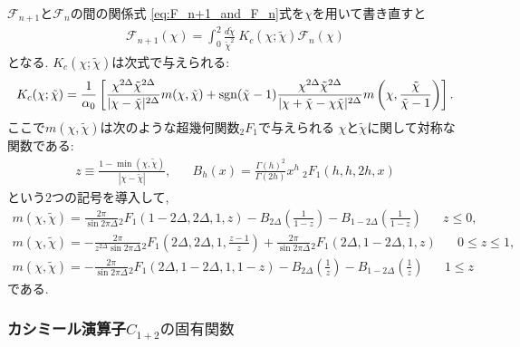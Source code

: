 $\mathcal{F}_{n+1}$と$\mathcal{F}_n$の間の関係式
\eqref{eq:F_n+1_and_F_n}式を$\chi$を用いて書き直すと
\begin{align}
	\mathcal{F}_{n+1}(\chi)
	= \int_0^2 \frac{d\tilde{\chi}}{\tilde{\chi}^2}\ 
		K_c(\chi; \tilde{\chi})\mathcal{F}_n(\chi)
	\label{eq:F_n+1_and_F_n_in_chi}
\end{align}
となる. 
$K_c(\chi; \tilde{\chi})$は次式で与えられる:
\begin{align}
	K_c(\chi; \tilde{\chi}) = \frac{1}{\alpha_0}\left[
		\frac{\chi^{2\Delta}\tilde{\chi}^{2\Delta}}{|\chi - \tilde{\chi}|^{2\Delta}}
		m(\chi, \tilde{\chi}) + \mathrm{sgn}(\tilde{\chi} - 1)
		\frac{\chi^{2\Delta}\tilde{\chi}^{2\Delta}}
			 {|\chi + \tilde{\chi} - \chi\tilde{\chi}|^{2\Delta}}
		m\left(\chi, \frac{\tilde{\chi}}{\tilde{\chi} - 1}\right)
	\right].
\end{align}
ここで$m(\chi, \tilde{\chi})$は次のような超幾何関数${}_2F_1$で与えられる
$\chi$と$\tilde{\chi}$に関して対称な関数である:
\begin{align}
	z \equiv \frac{1 - \min(\chi, \tilde{\chi})}{|\chi - \tilde{\chi}|},\hspace{20pt}
	B_h(x) = \frac{\Gamma(h)^2}{\Gamma(2h)}x^h\ {}_2F_1(h, h, 2h, x)
\end{align}
という2つの記号を導入して, 
\begin{align}
	m(\chi, \tilde{\chi})
	= \frac{2\pi}{\sin 2\pi\Delta}{}_2F_1(1 - 2\Delta, 2\Delta, 1, z)
	- B_{2\Delta}\left(\frac{1}{1 - z}\right)
	- B_{1 - 2\Delta}\left(\frac{1}{1 - z}\right)
	\hspace{20pt} z \leq 0,
\end{align}
\begin{align}
	m(\chi, \tilde{\chi})
	= -\frac{2\pi}{z^{2\Delta}\sin 2\pi\Delta}{}_2F_1\left(
		2\Delta, 2\Delta, 1, \frac{z - 1}{z}\right)
	+ \frac{2\pi}{\sin 2\pi\Delta}{}_2F_1(2\Delta, 1 - 2\Delta, 1, z)
	\hspace{20pt} 0 \leq z \leq 1,
\end{align}
\begin{align}
	m(\chi, \tilde{\chi})
	= -\frac{2\pi}{\sin 2\pi\Delta}{}_2F_1(2\Delta, 1 - 2\Delta, 1, 1 - z)
	- B_{2\Delta}\left(\frac{1}{z}\right)
	- B_{1 - 2\Delta}\left(\frac{1}{z}\right)
	\hspace{20pt} 1 \leq z 
\end{align}
である. 

\subsubsection{カシミール演算子$C_{1+2}の固有関数$}

